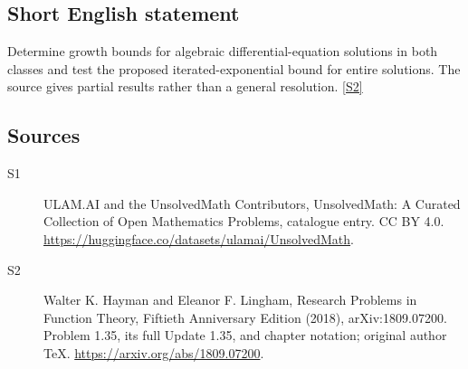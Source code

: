 \documentclass[11pt]{article}
\newcommand{\sref}[2]{\hyperlink{source:#1:#2}{[S#2]}}
\begin{document}
\subsection{Short English statement}
Determine growth bounds for algebraic differential-equation solutions in both classes and test the proposed iterated-exponential bound for entire solutions. The source gives partial results rather than a general resolution. \sref{statement}{2}
\subsection{Sources}
\begin{description}
\item[\hypertarget{source:statement:1}{S1}] ULAM.AI and the UnsolvedMath Contributors, UnsolvedMath: A Curated Collection of Open Mathematics Problems, catalogue entry. CC BY 4.0. \url{https://huggingface.co/datasets/ulamai/UnsolvedMath}.
\item[\hypertarget{source:statement:2}{S2}] Walter K. Hayman and Eleanor F. Lingham, Research Problems in Function Theory, Fiftieth Anniversary Edition (2018), arXiv:1809.07200. Problem 1.35, its full Update 1.35, and chapter notation; original author TeX. \url{https://arxiv.org/abs/1809.07200}.
\end{description}
\label{end:statement}
\end{document}
